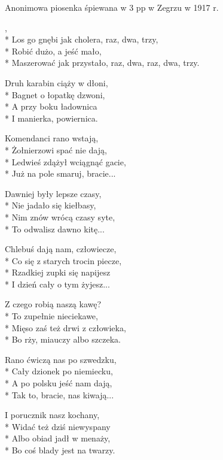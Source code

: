 \begin{info}Anonimowa piosenka śpiewana w 3 pp w Zegrzu w 1917 r.\end{info}

\begin{lyrics}[longestline={Maszerować jak przystało, raz, dwa, raz, dwa, trzy.}]

,\\*
Los go gnębi jak cholera, raz, dwa, trzy,\\*
Robić dużo, a jeść mało,\\*
Maszerować jak przystało, raz, dwa, raz, dwa, trzy.

Druh karabin ciąży w dłoni,\\*
Bagnet o łopatkę dzwoni,\\*
A przy boku ładownica\\*
I manierka, powiernica.

Komendanci rano wstają,\\*
Żołnierzowi spać nie dają,\\*
Ledwieś zdążył wciągnąć gacie,\\*
Już na pole smaruj, bracie...

Dawniej były lepsze czasy,\\*
Nie jadało się kiełbasy,\\*
Nim znów wrócą czasy syte,\\*
To odwalisz dawno kitę...

Chlebuś dają nam, człowiecze,\\*
Co się z starych trocin piecze,\\*
Rzadkiej zupki się napijesz\\*
I dzień cały o tym żyjesz...

Z czego robią naszą kawę?\\*
To zupełnie nieciekawe,\\*
Mięso zaś też drwi z człowieka,\\*
Bo rży, miauczy albo szczeka.

Rano ćwiczą nas po szwedzku,\\*
Cały dzionek po niemiecku,\\*
A po polsku jeść nam dają,\\*
Tak to, bracie, nas kiwają...

I porucznik nasz kochany,\\*
Widać też dziś niewyspany\\*
Albo obiad jadł w menaży,\\*
Bo coś blady jest na twarzy.
\end{lyrics}



